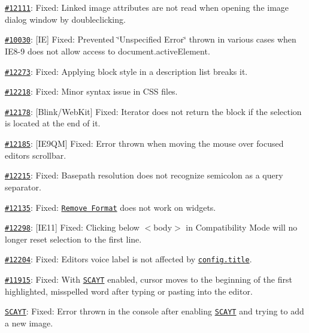 \begin{DoxyItemize}
\item \href{http://dev.ckeditor.com/ticket/12111}{\tt \#12111}\+: Fixed\+: Linked image attributes are not read when opening the image dialog window by doubleclicking.
\item \href{http://dev.ckeditor.com/ticket/10030}{\tt \#10030}\+: \mbox{[}IE\mbox{]} Fixed\+: Prevented \char`\"{}\+Unspecified Error\char`\"{} thrown in various cases when I\+E8-\/9 does not allow access to {\ttfamily document.\+active\+Element}.
\item \href{http://dev.ckeditor.com/ticket/12273}{\tt \#12273}\+: Fixed\+: Applying block style in a description list breaks it.
\item \href{http://dev.ckeditor.com/ticket/12218}{\tt \#12218}\+: Fixed\+: Minor syntax issue in C\+SS files.
\item \href{http://dev.ckeditor.com/ticket/12178}{\tt \#12178}\+: \mbox{[}Blink/\+Web\+Kit\mbox{]} Fixed\+: Iterator does not return the block if the selection is located at the end of it.
\item \href{http://dev.ckeditor.com/ticket/12185}{\tt \#12185}\+: \mbox{[}I\+E9\+QM\mbox{]} Fixed\+: Error thrown when moving the mouse over focused editor\textquotesingle{}s scrollbar.
\item \href{http://dev.ckeditor.com/ticket/12215}{\tt \#12215}\+: Fixed\+: Basepath resolution does not recognize semicolon as a query separator.
\item \href{http://dev.ckeditor.com/ticket/12135}{\tt \#12135}\+: Fixed\+: \href{http://ckeditor.com/addon/removeformat}{\tt Remove Format} does not work on widgets.
\item \href{http://dev.ckeditor.com/ticket/12298}{\tt \#12298}\+: \mbox{[}I\+E11\mbox{]} Fixed\+: Clicking below {\ttfamily $<$body$>$} in Compatibility Mode will no longer reset selection to the first line.
\item \href{http://dev.ckeditor.com/ticket/12204}{\tt \#12204}\+: Fixed\+: Editor\textquotesingle{}s voice label is not affected by \href{http://docs.ckeditor.com/#!/api/CKEDITOR.config-cfg-title}{\tt {\ttfamily config.\+title}}.
\item \href{http://dev.ckeditor.com/ticket/11915}{\tt \#11915}\+: Fixed\+: With \href{http://ckeditor.com/addon/scayt}{\tt S\+C\+A\+YT} enabled, cursor moves to the beginning of the first highlighted, misspelled word after typing or pasting into the editor.
\item \href{https://github.com/WebSpellChecker/ckeditor-plugin-scayt/issues/69}{\tt S\+C\+A\+YT}\+: Fixed\+: Error thrown in the console after enabling \href{http://ckeditor.com/addon/scayt}{\tt S\+C\+A\+YT} and trying to add a new image.
\end{DoxyItemize}

